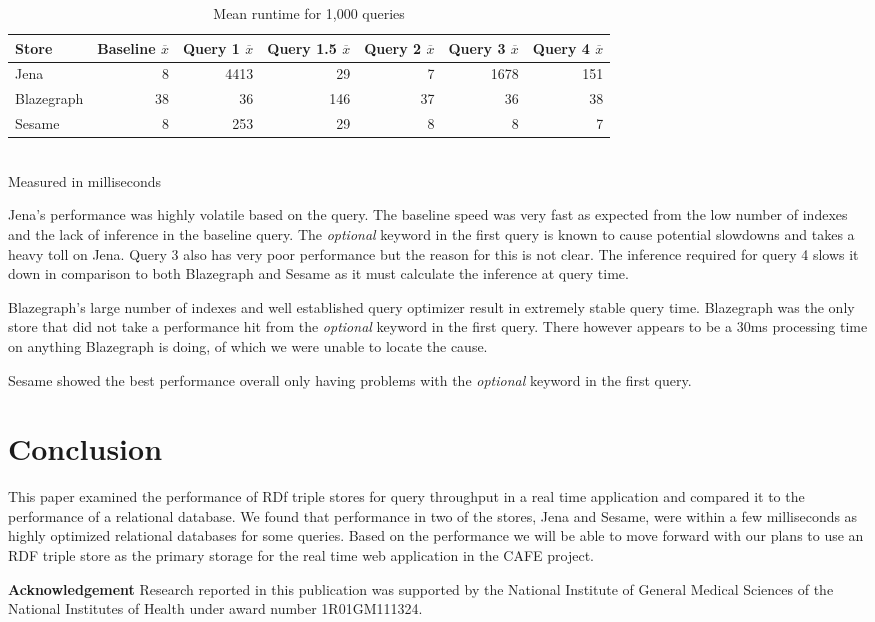 \documentclass{llncs}
\begin{document}
\begin{table}
\begin{center}
\caption{Mean runtime for 1,000 queries}
\begin{tabular}{l | r | r | r | r | r | r}
    Store & Baseline $\overline{x}$ & Query 1 $\overline{x}$ & Query 1.5 $\overline{x}$ & Query 2 $\overline{x}$ & Query 3 $\overline{x}$ & Query 4 $\overline{x}$ \\
\hline
Jena & 8 & 4413 & 29 & 7 & 1678 & 151 \\
Blazegraph & 38 & 36 & 146 & 37 & 36 & 38 \\
Sesame & 8 & 253 & 29 & 8 & 8 & 7
\end{tabular}
\\[5pt]
Measured in milliseconds
\end{center}
\end{table}

Jena's performance was highly volatile based on the query.  The baseline speed was very fast as expected from the low number of indexes and the lack of inference in the baseline query.  The \emph{optional} keyword in the first query is known to cause potential slowdowns and takes a heavy toll on Jena.  Query 3 also has very poor performance but the reason for this is not clear.  The inference required for query 4 slows it down in comparison to both Blazegraph and Sesame as it must calculate the inference at query time.

Blazegraph's large number of indexes and well established query optimizer result in extremely stable query time.  Blazegraph was the only store that did not take a performance hit from the \emph{optional} keyword in the first query.  There however appears to be a 30ms processing time on anything Blazegraph is doing, of which we were unable to locate the cause. 

Sesame showed the best performance overall only having problems with the \emph{optional} keyword in the first query.

\section{Conclusion}
This paper examined the performance of RDf triple stores for query throughput in a real time application and compared it to the performance of a relational database.  We found that performance in two of the stores, Jena and Sesame, were within a few milliseconds as highly optimized relational databases for some queries.  Based on the performance we will be able to move forward with our plans to use an RDF triple store as the primary storage for the real time web application in the CAFE project.

\medskip
\noindent
\textbf{Acknowledgement} Research reported in this publication was supported by the National Institute of General Medical Sciences of the National Institutes of Health under award number 1R01GM111324.



\end{document}
